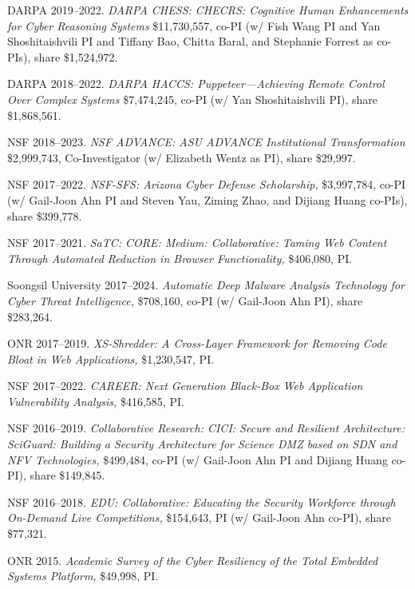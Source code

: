 \documentclass[11pt,letterpaper,sans]{moderncv}
\begin{document}
\begin{etaremune}

  \item DARPA 2019--2022. \textit{DARPA CHESS: CHECRS: Cognitive Human Enhancements for Cyber Reasoning Systems} \$11,730,557, co-PI (w/ Fish Wang PI and Yan Shoshitaishvili PI and Tiffany Bao, Chitta Baral, and Stephanie Forrest as co-PIs), share \$1,524,972.

  \item DARPA 2018--2022. \textit{DARPA HACCS: Puppeteer---Achieving Remote Control Over Complex Systems} \$7,474,245, co-PI (w/ Yan Shoshitaishvili PI), share \$1,868,561.

  \item NSF 2018--2023. \textit{NSF ADVANCE: ASU ADVANCE Institutional Transformation} \$2,999,743, Co-Investigator (w/ Elizabeth Wentz as PI), share \$29,997.
  
  \item NSF 2017--2022. \textit{NSF-SFS: Arizona Cyber Defense
    Scholarship,} \$3,997,784, co-PI (w/ Gail-Joon Ahn PI and Steven
    Yau, Ziming Zhao, and Dijiang Huang co-PIs), share \$399,778.

  \item NSF 2017--2021. \textit{SaTC: CORE: Medium: Collaborative:
    Taming Web Content Through Automated Reduction in Browser
    Functionality,} \$406,080, PI.

  \item Soongsil University 2017--2024. \textit{Automatic Deep Malware
    Analysis Technology for Cyber Threat Intelligence,} \$708,160,
    co-PI (w/ Gail-Joon Ahn PI), share \$283,264.

  \item ONR 2017--2019. \textit{XS-Shredder: A Cross-Layer Framework
    for Removing Code Bloat in Web Applications,} \$1,230,547, PI.

  \item NSF 2017--2022. \textit{CAREER: Next Generation Black-Box Web
    Application Vulnerability Analysis,} \$416,585, PI.
  
  \item NSF 2016--2019. \textit{Collaborative Research: CICI: Secure
    and Resilient Architecture: SciGuard: Building a Security
    Architecture for Science DMZ based on SDN and NFV Technologies,}
    \$499,484, co-PI (w/ Gail-Joon Ahn PI and Dijiang Huang co-PI),
    share \$149,845.

  \item NSF 2016--2018. \textit{EDU: Collaborative: Educating the
    Security Workforce through On-Demand Live Competitions,}
    \$154,643, PI (w/ Gail-Joon Ahn co-PI), share \$77,321.

  \item ONR 2015. \textit{Academic Survey of the Cyber Resiliency of
    the Total Embedded Systems Platform,} \$49,998, PI. 
  
\end{etaremune}
\end{document}
